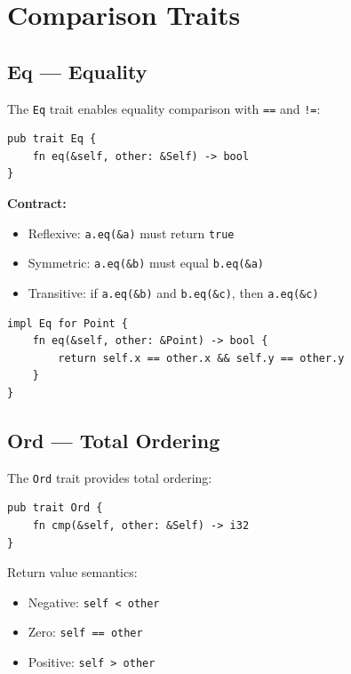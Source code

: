 \section{Comparison Traits}
\label{sec:comparison-traits}

\subsection{Eq --- Equality}

The \texttt{Eq} trait enables equality comparison with \texttt{==} and \texttt{!=}:

\begin{lstlisting}
pub trait Eq {
    fn eq(&self, other: &Self) -> bool
}
\end{lstlisting}

\textbf{Contract:}
\begin{itemize}
    \item Reflexive: \texttt{a.eq(\&a)} must return \texttt{true}
    \item Symmetric: \texttt{a.eq(\&b)} must equal \texttt{b.eq(\&a)}
    \item Transitive: if \texttt{a.eq(\&b)} and \texttt{b.eq(\&c)}, then \texttt{a.eq(\&c)}
\end{itemize}

\begin{lstlisting}
impl Eq for Point {
    fn eq(&self, other: &Point) -> bool {
        return self.x == other.x && self.y == other.y
    }
}
\end{lstlisting}

\subsection{Ord --- Total Ordering}

The \texttt{Ord} trait provides total ordering:

\begin{lstlisting}
pub trait Ord {
    fn cmp(&self, other: &Self) -> i32
}
\end{lstlisting}

Return value semantics:
\begin{itemize}
    \item Negative: \texttt{self < other}
    \item Zero: \texttt{self == other}
    \item Positive: \texttt{self > other}
\end{itemize}

